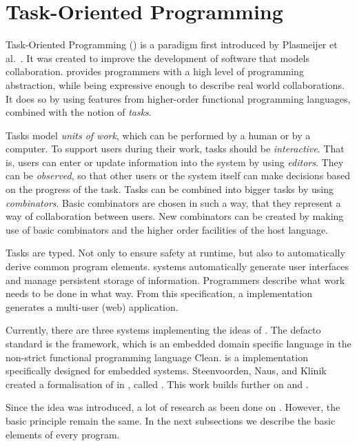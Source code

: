 
\section{Task-Oriented Programming}
\label{sec:top}

Task-Oriented Programming (\TOP) is a paradigm first introduced by Plasmeijer et al.~\cite{DBLP:conf/ppdp/PlasmeijerLMAK12}.
It was created to improve the development of software that models collaboration.
\TOP provides programmers with a high level of programming abstraction,
while being expressive enough to describe real world collaborations.
It does so by using features from higher-order functional programming languages,
combined with the notion of \emph{tasks}.

Tasks model \emph{units of work}, which can be performed by a human or by a computer.
To support users during their work, tasks should be \emph{interactive}.
That is, users can enter or update information into the system by using \emph{editors}.
They can be \emph{observed}, so that other users or the system itself can make decisions based on the progress of the task.
Tasks can be combined into bigger tasks by using \emph{combinators}.
Basic combinators are chosen in such a way, that they represent a way of collaboration between users.
New combinators can be created by making use of basic combinators and the higher order facilities of the host language.

Tasks are typed.
Not only to ensure safety at runtime,
but also to automatically derive common program elements.
\TOP systems automatically generate user interfaces and manage persistent storage of information.
Programmers describe what work needs to be done in what way.
From this specification, a \TOP implementation generates a multi-user (web) application.

Currently, there are three systems implementing the ideas of \TOP.
The defacto standard is the \ITASKS framework,
which is an embedded domain specific language in the non-strict functional programming language Clean.
\MTASKS is a \TOP implementation specifically designed for embedded systems.
Steenvoorden, Naus, and Klinik created a formalisation of \TOP in \cite{},
called \TOPHAT.
This work builds further on \TOPHAT and \STOPHAT.

Since the idea was introduced, a lot of research as been done on \TOP.
However, the basic principle remain the same.
In the next subsections we describe the basic elements of every \TOP program.


